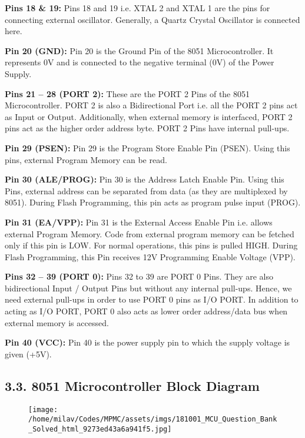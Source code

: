 \documentclass[
]{article}
\begin{document}
\textbf{Pins 18 \& 19:} Pins 18 and 19 i.e. XTAL 2 and XTAL 1 are the
pins for connecting external oscillator. Generally, a Quartz Crystal
Oscillator is connected here.

\textbf{Pin 20 (GND):} Pin 20 is the Ground Pin of the 8051
Microcontroller. It represents 0V and is connected to the negative
terminal (0V) of the Power Supply.

\textbf{Pins 21 -- 28 (PORT 2):} These are the PORT 2 Pins of the 8051
Microcontroller. PORT 2 is also a Bidirectional Port i.e. all the PORT 2
pins act as Input or Output. Additionally, when external memory is
interfaced, PORT 2 pins act as the higher order address byte. PORT 2
Pins have internal pull-ups.

\textbf{Pin 29 (PSEN):} Pin 29 is the Program Store Enable Pin (PSEN).
Using this pins, external Program Memory can be read.

\textbf{Pin 30 (ALE/PROG):} Pin 30 is the Address Latch Enable Pin.
Using this Pins, external address can be separated from data (as they
are multiplexed by 8051). During Flash Programming, this pin acts as
program pulse input (PROG).

\textbf{Pin 31 (EA/VPP):} Pin 31 is the External Access Enable Pin i.e.
allows external Program Memory. Code from external program memory can be
fetched only if this pin is LOW. For normal operations, this pins is
pulled HIGH. During Flash Programming, this Pin receives 12V Programming
Enable Voltage (VPP).

\textbf{Pins 32 -- 39 (PORT 0):} Pins 32 to 39 are PORT 0 Pins. They are
also bidirectional Input / Output Pins but without any internal
pull-ups. Hence, we need external pull-ups in order to use PORT 0 pins
as I/O PORT. In addition to acting as I/O PORT, PORT 0 also acts as
lower order address/data bus when external memory is accessed.

\textbf{Pin 40 (VCC):} Pin 40 is the power supply pin to which the
supply voltage is given (+5V).

\hypertarget{33-8051-microcontroller-block-diagram}{%
\subsection{3.3. 8051 Microcontroller Block
Diagram}\label{33-8051-microcontroller-block-diagram}}

\begin{figure}
\centering
\texttt{[image: /home/milav/Codes/MPMC/assets/imgs/181001\_MCU\_Question\_Bank\_Solved\_html\_9273ed43a6a941f5.jpg]}
\caption{}
\end{figure}
\end{document}
